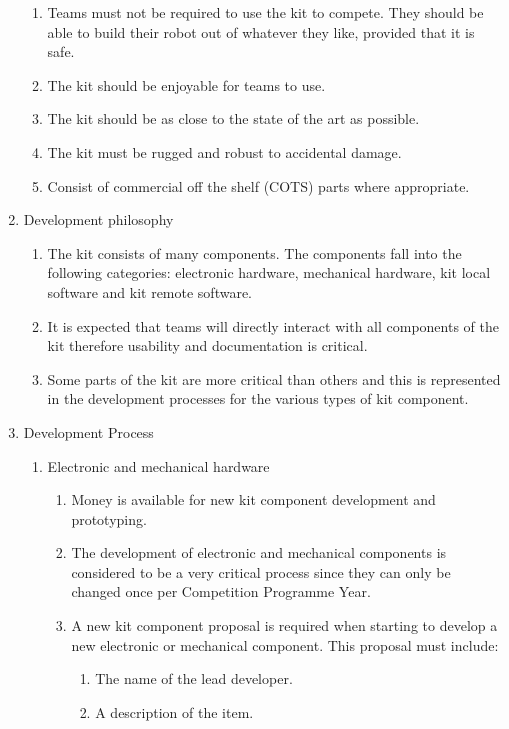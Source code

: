 \begin{enumerate}
\begin{enumerate}
    \item Teams must not be required to use the kit to compete.  They should be able to build their robot out of whatever they like, provided that it is safe.

    \item The kit should be enjoyable for teams to use.

    \item The kit should be as close to the state of the art as possible.

    \item The kit must be rugged and robust to accidental damage.
    \item{Consist of commercial off the shelf (COTS) parts where appropriate.}
  \end{enumerate}
\item Development philosophy
  \begin{enumerate}
    \item The kit consists of many components. The components fall into the following categories: electronic hardware, mechanical hardware, kit local software and kit remote software.
    \item It is expected that teams will directly interact with all components of the kit therefore usability and documentation is critical.
    \item Some parts of the kit are more critical than others and this is represented in the development processes for the various types of kit component.
  \end{enumerate}
\item Development Process
  \begin{enumerate}
    \item Electronic and mechanical hardware
      \begin{enumerate}
        \item Money is available for new kit component development and prototyping.
        \item The development of electronic and mechanical components is considered to be a very critical process since they can only be changed once per Competition Programme Year.
        \item A new kit component proposal is required when starting to develop a new electronic or mechanical component. This proposal must include:
          \begin{enumerate}
            \item The name of the lead developer.
            \item A description of the item.

\end{enumerate}
\end{enumerate}
\end{enumerate}
\end{enumerate}

